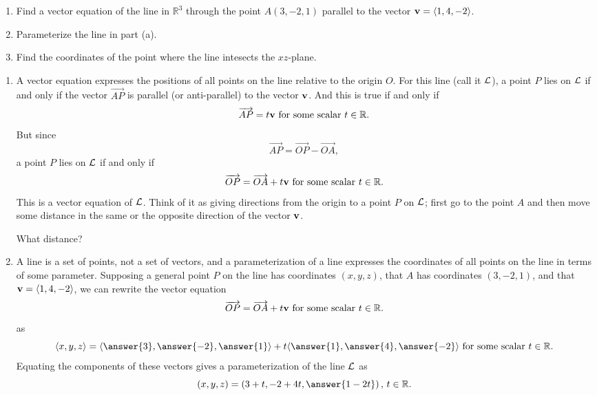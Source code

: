 \documentclass{ximera}
\begin{document}
\begin{example} \label{Ex3434523093}
\begin{enumerate}
\item Find a vector equation of the line in $\mathbb{R}^3$ through the point $A(3,-2,1)$ parallel to the vector ${\bf v}  =\langle 1,4,-2\rangle$.

\item Parameterize the line in part (a).

\item Find the coordinates of the point where the line intesects the $xz$-plane.

\end{enumerate}

\begin{explanation}
\begin{enumerate}
\item A vector equation expresses the positions of all points on the line relative to the origin $O$. For this line (call it ${\cal L}$), a point $P$ lies on ${\cal L}$ if and only if the vector $\overrightarrow{AP}$ is parallel (or anti-parallel) to the vector ${\bf v}$. And this is true if and only if
\[
       \overrightarrow{AP} = t {\bf v} \text{ for some scalar } t\in \mathbb{R} .
\]
But since
\[
    \overrightarrow{AP} = \overrightarrow{OP} - \overrightarrow{OA} ,
\]
a point $P$ lies on ${\cal L}$ if and only if
\[
    \overrightarrow{OP} = \overrightarrow{OA} + t {\bf v} \text{ for some scalar } t\in \mathbb{R}.
\]
This is a vector equation of ${\cal L}$. Think of it as giving directions from the origin to a point $P$ on ${\cal L}$; first go to the point $A$ and then move some distance in the same or the opposite direction of the vector ${\bf v}$.

What distance?
\begin{multipleChoice}
\end{multipleChoice}

\item A line is a set of points, not a set of vectors, and a parameterization of a line expresses the coordinates of all points on the line in terms of some parameter. Supposing a general point $P$ on the line has coordinates $(x,y,z)$, that $A$ has coordinates $(3,-2,1)$, and that ${\bf v} = \langle 1,4,-2\rangle$, we can rewrite the vector equation
\[
    \overrightarrow{OP} = \overrightarrow{OA} + t {\bf v} \text{ for some scalar } t\in \mathbb{R}.
\]
as
\[
    \langle x, y, z \rangle = \langle \answer{3}, \answer{-2}, \answer{1} \rangle + t \langle \answer{1}, \answer{4}, \answer{-2} \rangle \text{ for some scalar } t\in \mathbb{R}.
\]
Equating the components of these vectors gives a parameterization of the line ${\cal L}$ as 
\[
   (x,y,z) = (3+t , -2 + 4t, \answer{1-2t}) \, , \, t\in \mathbb{R} .
\]


\end{enumerate}
\end{explanation}
\end{example}
\end{document}
